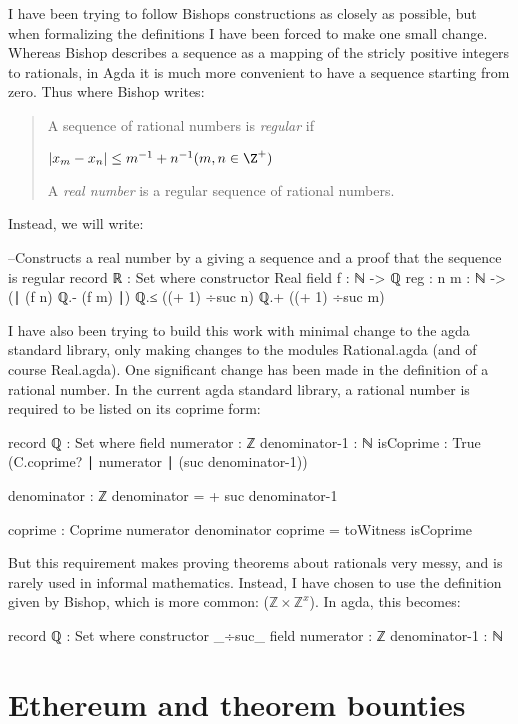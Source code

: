 \documentclass[11pt,a4paper]{article}
\begin{document}
I have been trying to follow Bishops constructions as closely as possible, but when formalizing the definitions I have been forced to make one small change. Whereas Bishop describes a sequence as a mapping of the stricly positive integers to rationals, in Agda it is much more convenient to have a sequence starting from zero. Thus where Bishop writes:
\blockquote{
A sequence of rational numbers is \textit{regular} if
\begin{center}
$| x_m - x_n | \leq m^{-1} + n^{-1} (m, n \in \Z^+)$
\end{center}
A \textit{real number} is a regular sequence of rational numbers.
}

Instead, we will write:
\begin{code}
--Constructs a real number by a giving a sequence and a proof that the sequence is regular
record ℝ : Set where
  constructor Real
  field
    f : ℕ -> ℚ
    reg : {n m : ℕ} -> (∣ (f n) ℚ.- (f m) ∣) ℚ.≤ ((+ 1) ÷suc n) ℚ.+ ((+ 1) ÷suc m)

\end{code}

I have also been trying to build this work with minimal change to the agda standard library, only making changes to the modules Rational.agda (and of course Real.agda). One significant change has been made in the definition of a rational number. In the current agda standard library, a rational number is required to be listed on its coprime form:
\begin{code}

record ℚ : Set where
  field
    numerator     : ℤ
    denominator-1 : ℕ
    isCoprime     : True (C.coprime? ∣ numerator ∣ (suc denominator-1))

  denominator : ℤ
  denominator = + suc denominator-1

  coprime : Coprime numerator denominator
  coprime = toWitness isCoprime
\end{code}

But this requirement makes proving theorems about rationals very messy, and is rarely used in informal mathematics. Instead, I have chosen to use the definition given by Bishop, which is more common: ($ℤ \times ℤ^x$). In agda, this becomes:
\begin{code}
record ℚ : Set where
  constructor _÷suc_
  field
    numerator     : ℤ
    denominator-1 : ℕ
\end{code}


\section{Ethereum and theorem bounties}
\end{document}
